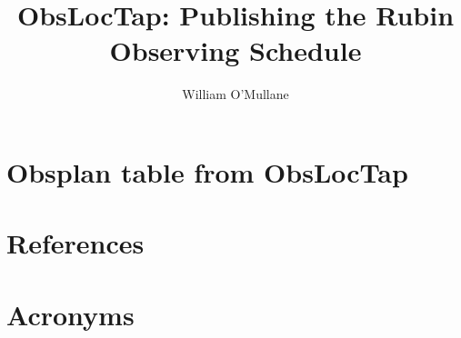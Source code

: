 \documentclass[DM,lsstdraft,authoryear,toc]{lsstdoc}
\title{ObsLocTap: Publishing the Rubin Observing Schedule}
\author{%
William O'Mullane
}
\date{\vcsDate}
\begin{document}
\mkshorttitle



\appendix
\section{Obsplan table from ObsLocTap} \label{sec:obsplan}

\section{References} \label{sec:bib}
\renewcommand{\refname}{} %


\section{Acronyms} \label{sec:acronyms}

\end{document}
